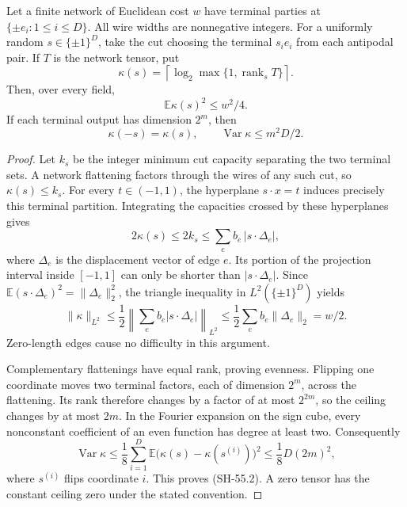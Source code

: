 \begin{lemma}
\label{lem:sign-rank-second-moment}
Let a finite network of Euclidean cost $w$ have terminal
parties at $\{\pm e_i:1\leq i\leq D\}$.  All wire
widths are nonnegative integers.  For a uniformly random
$s\in\{\pm1\}^D$, take the cut choosing the terminal
$s_i e_i$ from each antipodal pair.  If $T$ is the
network tensor, put
\[
 \kappa(s)=\left\lceil\log_2\max\{1,
              \operatorname{rank}_s T\}\right\rceil.
\]
Then, over every field,
\[
                 \mathbb E\kappa(s)^2\leq w^2/4.
 \tag{SH-55.1}
\]
If each terminal output has dimension $2^m$, then
\[
 \kappa(-s)=\kappa(s),\qquad
 \operatorname{Var}\kappa\leq m^2D/2.
 \tag{SH-55.2}
\]
\end{lemma}
\begin{proof}
Let $k_s$ be the integer minimum cut capacity separating
the two terminal sets.  A network flattening factors
through the wires of any such cut, so
$\kappa(s)\leq k_s$.  For every $t\in(-1,1)$, the
hyperplane $s\cdot x=t$ induces precisely this terminal
partition.  Integrating the capacities crossed by these
hyperplanes gives
\[
 2\kappa(s)\leq2k_s
 \leq\sum_e b_e\,|s\cdot\Delta_e|,
\]
where $\Delta_e$ is the displacement vector of edge $e$.
Its portion of the projection interval inside $[-1,1]$
can only be shorter than $|s\cdot\Delta_e|$.  Since
$\mathbb E(s\cdot\Delta_e)^2=\|\Delta_e\|_2^2$,
the triangle inequality in $L^2(\{\pm1\}^D)$ yields
\[
 \|\kappa\|_{L^2}
 \leq\frac12\left\|\sum_e b_e|s\cdot\Delta_e|\right\|_{L^2}
 \leq\frac12\sum_e b_e\|\Delta_e\|_2=w/2.
\]
Zero-length edges cause no difficulty in this argument.

Complementary flattenings have equal rank, proving
evenness.  Flipping one coordinate moves two terminal
factors, each of dimension $2^m$, across the flattening.
Its rank therefore changes by a factor of at most
$2^{2m}$, so the ceiling changes by at most $2m$.
In the Fourier expansion on the sign cube, every
nonconstant coefficient of an even function has degree
at least two.  Consequently
\[
 \operatorname{Var}\kappa
 \leq\frac18\sum_{i=1}^D
       \mathbb E\bigl(\kappa(s)-\kappa(s^{(i)})\bigr)^2
 \leq\frac18D(2m)^2,
\]
where $s^{(i)}$ flips coordinate $i$.  This proves
(SH-55.2).  A zero tensor has the constant ceiling zero
under the stated convention.
\end{proof}

